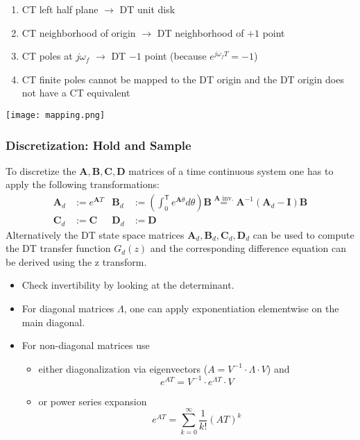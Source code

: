 \begin{enumerate}
    \item CT left half plane $\rightarrow$ DT unit disk
    \item CT neighborhood of origin $\rightarrow$ DT neighborhood of $+1$ point
    \item CT poles at $j\omega_f$ $\rightarrow$ DT $-1$ point (because $e^{j\omega_{f}T}=-1$)
    \item CT finite poles cannot be mapped to the DT origin and the DT origin does not have a CT equivalent
\end{enumerate}

\begin{center}
    \texttt{[image: mapping.png]}
\end{center}


\subsubsection{Discretization: Hold and Sample}\label{disc::hold_and_sample}

To discretize the $\mathbf{A}, \mathbf{B}, \mathbf{C}, \mathbf{D}$ matrices of a time continuous system one has to apply the following transformations:
\begin{align*}
    \mathbf{A}_d & :=e^{\mathbf{A}T} & \mathbf{B}_d & :=\left(\int_0^{\mathsf{T}} {e^{\mathbf{A}\theta}}d\theta\right)\mathbf{B} \overset{\mathbf{A} \text{ inv.}}{=} \mathbf{A}^{-1}\left(\mathbf{A}_d-\mathbf{I}\right)\mathbf{B} \\
    \mathbf{C}_d & :=\mathbf{C}      & \mathbf{D}_d & :=\mathbf{D}
\end{align*}
Alternatively the DT state space matrices $\mathbf{A}_d, \mathbf{B}_d, \mathbf{C}_d, \mathbf{D}_d$ can be used to compute the DT transfer function $G_{d}(z)$ and the corresponding difference equation can be derived using the z transform.\\
\newpar{}
\begin{itemize}
    \item Check invertibility by looking at the determinant.
    \item For diagonal matrices $\Lambda$, one can apply exponentiation elementwise on the main diagonal.
    \item For non-diagonal matrices use
          \begin{itemize}
              \item either diagonalization via eigenvectors ($A=V^{-1}\cdot \Lambda \cdot V$) and
                    \begin{equation*}
                        e^{AT} = V^{-1}\cdot e^{\Lambda T} \cdot V
                    \end{equation*}
              \item or power series expansion
                    \begin{equation*}
                        e^{AT}=\sum_{k=0}^{\infty}\frac{1}{k!}{\left(AT\right)}^k
                    \end{equation*}
          \end{itemize}
\end{itemize}

